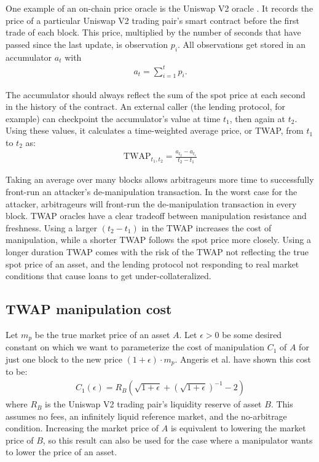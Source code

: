 \documentclass[conference]{IEEEtran}
\begin{document}
One example of an on-chain price oracle is the Uniswap V2 oracle \cite{Adams2020UniV2}. It records the price of a particular Uniswap V2 trading pair's smart contract before the first trade of each block. This price, multiplied by the number of seconds that have passed since the last update, is observation $p_i$. All observations get stored in an accumulator $a_t$ with
\begin{align*}
    a_t = \sum_{i=1}^{t}p_i.
\end{align*}

The accumulator should always reflect the sum of the spot price at each second in the history of the contract.
An external caller (the lending protocol, for example) can checkpoint the accumulator's value at time $t_1$, then again at $t_2$. Using these values, it calculates a time-weighted average price, or TWAP, from $t_1$ to $t_2$ as:
\begin{align*}
    \text{TWAP}_{t_1,t_2} = \frac{a_{t_2} - a_{t_1}}{t_2 - t_1} 
\end{align*}

Taking an average over many blocks allows arbitrageurs more time to successfully front-run an attacker's de-manipulation transaction. In the worst case for the attacker, arbitrageurs will front-run the de-manipulation transaction in every block. TWAP oracles have a clear tradeoff between manipulation resistance and freshness. Using a larger $(t_2 - t_1)$ in the TWAP increases the cost of manipulation, while a shorter TWAP follows the spot price more closely. Using a longer duration TWAP comes with the risk of the TWAP not reflecting the true spot price of an asset, and the lending protocol not responding to real market conditions that cause loans to get under-collateralized. 

\subsection{TWAP manipulation cost}
Let $m_p$ be the true market price of an asset $A$. Let $\epsilon > 0$ be some desired constant on which we want to parameterize the cost of manipulation $C_1$ of $A$ for just one block to the new price $(1+\epsilon)\cdot m_p$. Angeris et al. \cite{angeris2019uniswap} have shown this cost to be:
\begin{align*}
    C_1(\epsilon) = R_B(\sqrt{1+\epsilon} + (\sqrt{1+\epsilon})^{-1} -2)
\end{align*}
where $R_B$ is the Uniswap V2 trading pair's liquidity reserve of asset $B$. This assumes no fees, an infinitely liquid reference market, and the no-arbitrage condition. Increasing the market price of $A$ is equivalent to lowering the market price of $B$, so this result can also be used for the case where a manipulator wants to lower the price of an asset. 
\end{document}
